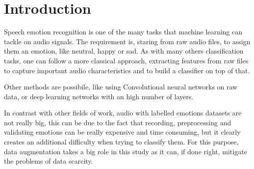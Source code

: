 \section{Introduction}

Speech emotion recognition is one of the many tasks that machine learning 
can tackle on audio signals. The requirement is, staring from raw audio files, 
to assign them an emotion, like neutral, happy or sad. 
As with many others classification tasks, one can follow a more classical 
approach, extracting features from raw files to capture important audio characteristics
and to build a classifier on top of that. 

Other methods are possibile, like using Convolutional neural networks on raw data, 
or deep learning networks with an high number of layers.

In contrast with other fields of work, audio with labelled emotions datasets are not
really big, this can be due to the fact that recording, preprocessing and validating 
emotions can be really expensive and time consuming, but it clearly creates an additional 
difficulty when trying to classify them. For this purpose, data augmentation takes a big role 
in this study as it can, if done right, mitigate the problems of data scarcity. 
